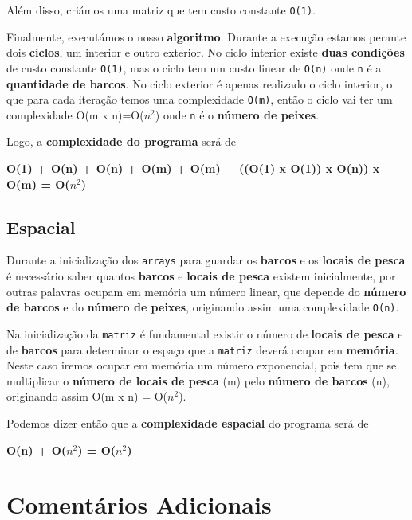 \documentclass[11pt]{article}
\begin{document}
Além disso, criámos uma matriz que tem custo constante \verb|O(1)|.

Finalmente, executámos o nosso \textbf{algoritmo}. Durante a execução estamos perante dois \textbf{ciclos},
um interior e outro exterior. No ciclo interior existe \textbf{duas condições} de custo constante \verb|O(1)|,
mas o ciclo tem um custo linear de \verb|O(n)| onde \verb|n| é a \textbf{quantidade de barcos}.
No ciclo exterior é apenas realizado o ciclo interior, o que para cada iteração temos uma complexidade
\verb|O(m)|, então o ciclo vai ter um complexidade O(m x n)=O($n^{2}$) onde \verb|n| é o \textbf{número de
peixes}.

Logo, a \textbf{complexidade do programa} será de

\begin{center}
    \textbf{O(1) + O(n) + O(n) + O(m) + O(m) + ((O(1) x O(1)) x O(n)) x O(m) = O($n^{2}$)}
\end{center}

\subsection{Espacial}

\hspace{0,5cm}Durante a inicialização dos \verb|arrays| para guardar os \textbf{barcos} e os \textbf{locais de pesca}
é necessário saber quantos \textbf{barcos} e \textbf{locais de pesca} existem inicialmente, por outras
palavras ocupam em memória um número linear, que depende do \textbf{número de barcos} e do \textbf{número de
peixes}, originando assim uma complexidade \verb|O(n)|.

Na inicialização da \verb|matriz| é fundamental existir o número de \textbf{locais de pesca} e de \textbf{barcos}
para determinar o espaço que a \verb|matriz| deverá ocupar em \textbf{memória}. Neste caso iremos ocupar em memória
um número exponencial, pois tem que se multiplicar o \textbf{número de locais de pesca} (m) pelo \textbf{número de barcos}
(n), originando assim O(m x n) = O($n^{2}$).

Podemos dizer então que a \textbf{complexidade espacial} do programa será de 
\begin{center}
    \textbf{O(n) + O($n^{2}$) = O($n^{2}$)}
\end{center}


\section{Comentários Adicionais}
\end{document}
